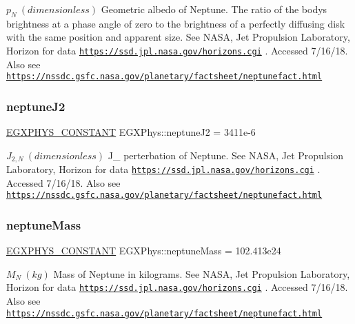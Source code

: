 $ p_{N} \ (dimensionless)$ Geometric albedo of Neptune. The ratio of the body\textquotesingle{}s brightness at a phase angle of zero to the brightness of a perfectly diffusing disk with the same position and apparent size. See N\+A\+SA, Jet Propulsion Laboratory, Horizon for data \href{https://ssd.jpl.nasa.gov/horizons.cgi}{\tt https\+://ssd.\+jpl.\+nasa.\+gov/horizons.\+cgi} . Accessed 7/16/18. Also see \href{https://nssdc.gsfc.nasa.gov/planetary/factsheet/neptunefact.html}{\tt https\+://nssdc.\+gsfc.\+nasa.\+gov/planetary/factsheet/neptunefact.\+html} \mbox{\label{group___e_g_x_phys-_constants-_astrophysics-_solar_system-_neptune-_bulk_gab479e5e35fc2abd4da44ac8ef8fa3f3c}} 
\subsubsection{\texorpdfstring{neptune\+J2}{neptuneJ2}}
{\footnotesize\ttfamily \mbox{\hyperlink{group___e_g_x_phys-_constants-_macros_ga76980d288494ce1714c9ac68a95ba702}{E\+G\+X\+P\+H\+Y\+S\+\_\+\+C\+O\+N\+S\+T\+A\+NT}} E\+G\+X\+Phys\+::neptune\+J2 = 3411e-\/6}

$ J_{2,N} \ (dimensionless)$ J\+\_ perterbation of Neptune. See N\+A\+SA, Jet Propulsion Laboratory, Horizon for data \href{https://ssd.jpl.nasa.gov/horizons.cgi}{\tt https\+://ssd.\+jpl.\+nasa.\+gov/horizons.\+cgi} . Accessed 7/16/18. Also see \href{https://nssdc.gsfc.nasa.gov/planetary/factsheet/neptunefact.html}{\tt https\+://nssdc.\+gsfc.\+nasa.\+gov/planetary/factsheet/neptunefact.\+html} \mbox{\label{group___e_g_x_phys-_constants-_astrophysics-_solar_system-_neptune-_bulk_gab142e8ab6de08f634c159a0fe1f4a653}} 
\subsubsection{\texorpdfstring{neptune\+Mass}{neptuneMass}}
{\footnotesize\ttfamily \mbox{\hyperlink{group___e_g_x_phys-_constants-_macros_ga76980d288494ce1714c9ac68a95ba702}{E\+G\+X\+P\+H\+Y\+S\+\_\+\+C\+O\+N\+S\+T\+A\+NT}} E\+G\+X\+Phys\+::neptune\+Mass = 102.\+413e24}

$M_{N} \ (kg)$ Mass of Neptune in kilograms. See N\+A\+SA, Jet Propulsion Laboratory, Horizon for data \href{https://ssd.jpl.nasa.gov/horizons.cgi}{\tt https\+://ssd.\+jpl.\+nasa.\+gov/horizons.\+cgi} . Accessed 7/16/18. Also see \href{https://nssdc.gsfc.nasa.gov/planetary/factsheet/neptunefact.html}{\tt https\+://nssdc.\+gsfc.\+nasa.\+gov/planetary/factsheet/neptunefact.\+html} \mbox{\label{group___e_g_x_phys-_constants-_astrophysics-_solar_system-_neptune-_bulk_ga2060841ebac89fa7672b789d14ed02a3}} 
